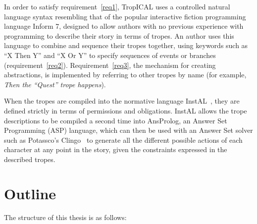 \documentclass[11pt]{report}
\begin{document}
In order to satisfy requirement~\ref{req1}, TropICAL uses a controlled
natural language syntax resembling that of the popular interactive fiction
programming language Inform 7, designed to allow authors with no previous
experience with programming to describe their story in terms of tropes. An
author uses this language to combine and sequence their tropes together, using
keywords such as ``X Then Y'' and ``X Or Y'' to specify sequences of events or
branches (requirement~\ref{req2}). Requirement~\ref{req3}, the mechanism for
creating abstractions, is implemented by referring to other tropes by name (for
example, \emph{Then the ``Quest'' trope happens}).

When the tropes are compiled into the normative language InstAL~\citep{cliffe2007specifying}, they are defined
strictly in terms of permissions and obligations. InstAL allows the trope
descriptions to be compiled a second time into AnsProlog, an Answer Set
Programming (ASP) language, which can then be used with an Answer Set solver
such as Potassco's Clingo~\citep{gebser2011potassco} to generate all the different
possible actions of each character at any point in the story, given the
constraints expressed in the described tropes.

\section{Outline}

The structure of this thesis is as follows:
\end{document}
